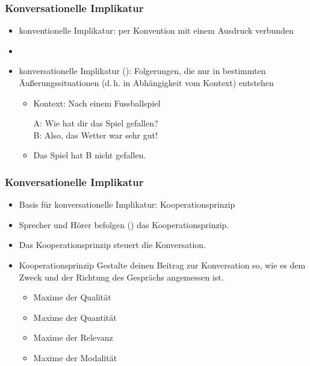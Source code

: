 
\begin{frame}
\frametitle{Konversationelle Implikatur}

\begin{itemize}
	\item konventionelle Implikatur: per Konvention mit einem Ausdruck verbunden
	\item[]
	\item konversationelle Implikatur (\implc ):
Folgerungen, die nur in bestimmten Äu\ss{}erungssituationen (d.\,h. in Abhängigkeit vom Kontext) entstehen

\vspace{5mm}

	\begin{itemize}
		\item Kontext: Nach einem Fussballspiel
		
		\ea A: Wie hat dir das Spiel gefallen?\\ B: Also, das Wetter war sehr gut!\\
		\item[] \implc Das Spiel hat B nicht gefallen.
		\z
	\end{itemize}
	
\end{itemize}

\end{frame}



\begin{frame}
\frametitle{Konversationelle Implikatur}

\begin{itemize}
	\item Basis für konversationelle Implikatur: Kooperationsprinzip
	\medskip
	\item Sprecher und Hörer befolgen (\idR) das Kooperationsprinzip.
	\item Das Kooperationsprinzip steuert die Konversation.
	
	\item[]
	
	\begin{block}{Kooperationsprinzip}
		Gestalte deinen Beitrag zur Konversation so, wie es dem Zweck und der Richtung des Gesprächs angemessen ist.
		
		\begin{itemize}
			\item Maxime der Qualität
			\item Maxime der Quantität
			\item Maxime der Relevanz
			\item Maxime der Modalität
		\end{itemize}
	
	\end{block}
	
\end{itemize}

\end{frame}


